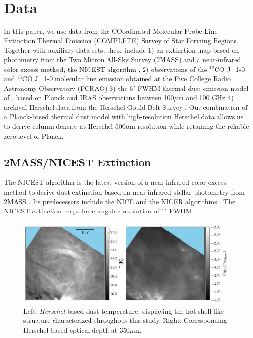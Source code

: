 \documentclass[11pt,a4paper]{emulateapj}
\begin{document}
\section{Data}
\label{sec:data}
In this paper, we use data from the COordinated Molecular Probe Line Extinction Thermal Emission (COMPLETE) Survey of Star Forming Regions. Together with auxiliary data sets, these include 1) an extinction map based on photometry from the Two Micron All-Sky Survey (2MASS) and a near-infrared color excess method, the NICEST algorithm \citep[][note that this is an improved version of the NICER algorithm and is developed after the COMPLETE Survey]{Lombardi_2009}, 2) observations of the $^{12}$CO J=1-0 and $^{13}$CO J=1-0 molecular line emission obtained at the Five College Radio Astronomy Observatory (FCRAO) 3) the 6$'$ FWHM thermal dust emission model of \cite{Meisner_2015}, based on Planck and IRAS observations between 100$\mu$m and 100 GHz 4) archival Herschel data from the Herschel Gould Belt Survey \citep{Andre_2010}. Our combination of a Planck-based thermal dust model with high-resolution Herschel data allows us to derive column density at Herschel 500$\mu$m resolution while retaining the reliable zero level of Planck.

\subsection{2MASS/NICEST Extinction}
The NICEST algorithm is the latest version of a near-infrared color excess method to derive dust extinction based on near-infrared stellar photometry from 2MASS \citep{Lombardi_2009}. Its predecessors include the NICE and the NICER algorithms \citep{Lombardi_2001,Lombardi_2005}. The NICEST extinction maps have angular resolution of $1'$ FWHM.

\begin{figure}[ht]
\centering
\includegraphics[scale=0.8]{fig/shell_herschel.png}
\caption{\label{fig:herschel_shell}Left: \textit{Herschel}-based dust temperature, displaying the hot shell-like structure characterized throughout this study. Right: Corresponding Herschel-based optical depth at 350$\mu$m.
}
\end{figure}
\end{document}
